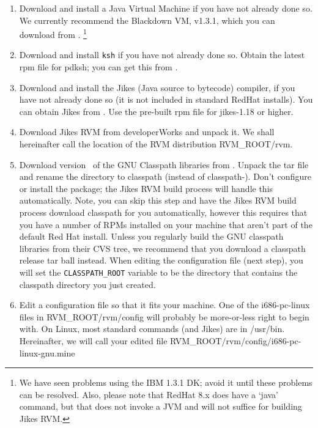 \begin{enumerate}

\item Download and install a Java Virtual Machine if you have not
already done so.  We currently recommend the Blackdown VM, v1.3.1,
which you can download from \xlink{{\tt \BlackdownURL}}
{\BlackdownURL}. \footnote{We have seen problems using the IBM 1.3.1
DK; avoid it until these problems can be resolved. Also, please note
that RedHat 8.x does have a `java' command, but that does not invoke a
JVM and will not suffice for building Jikes RVM.}

\item Download and install {\tt ksh} if you have not already done so.
Obtain the latest rpm file for pdksh; you can get this from
. 

\item Download and install the Jikes (Java source to bytecode)
compiler, if you have not already 
done so (it is not included in standard RedHat installs).  You can
obtain Jikes from .
Use the pre-built rpm file for jikes-1.18 or higher.

\item Download Jikes RVM from developerWorks and unpack it.  We shall
hereinafter call the location of the RVM distribution RVM\_ROOT/rvm.

\item Download version \classpathversion\ of the GNU Classpath
libraries from 
\xlink{\tt \classpathftp}{\classpathftp}. 
Unpack the tar file and rename the
directory to classpath (instead of classpath-\classpathversion). Don't
configure or install the package; the Jikes RVM build process will
handle this automatically.  Note, you can skip this step and have the
Jikes RVM build process download classpath for you automatically,
however this requires that you have a number of RPMs installed
on your machine that aren't part of the default Red Hat install.
Unless you regularly build the GNU classpath libraries from their CVS
tree, we recommend that you download a classpath release tar ball
instead. When editing the configuration file (next step), you will set
the {\tt CLASSPATH\_ROOT} variable to be the directory that contains the
classpath directory you just created.  

\item Edit a configuration file so that it fits your machine.  One of
the i686-pc-linux files in RVM\_ROOT/rvm/config will probably be
more-or-less right to begin with.  On Linux, most standard commands
(and Jikes) are in /usr/bin.  Hereinafter, we will call your edited
file RVM\_ROOT/rvm/config/i686-pc-linux-gnu.mine


\end{enumerate}
